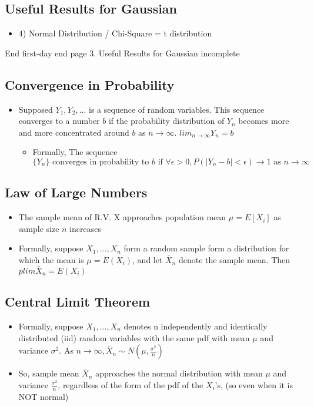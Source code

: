 \documentclass[10pt, oneside]{article}
\begin{document}
\subsection{Useful Results for Gaussian}
\begin{itemize}
    \item 4) Normal Distribution / Chi-Square = t distribution
\end{itemize}


End first-day end page 3. Useful Results for Gaussian incomplete

\subsection{Convergence in Probability}
\begin{itemize}
    \item Supposed $Y_1, Y_2,...$ is a sequence of random variables. This sequence converges to a number $b$ if the probability distribution of $Y_n$ becomes more and more concentrated around $b$ as $n\rightarrow \infty$. $lim_{n\rightarrow \infty} Y_n = b$
    \begin{itemize}
        \item Formally, The sequence $\{Y_n\} \text{ converges in probability to } b \text{ if }\forall \epsilon > 0, P(|Y_n-b| < \epsilon) \rightarrow 1 \text{ as } n\rightarrow \infty$
    \end{itemize}
\end{itemize}

\subsection{Law of Large Numbers}
\begin{itemize}
    \item The sample mean of R.V. X approaches population mean $\mu = E[X_i]$ as sample size $n$ increases
    \item Formally, suppose $X_1, ..., X_n$ form a random sample form a distribution for which the mean is $\mu =E(X_i)$, and let $\bar X_n $ denote the sample mean. Then $plim \bar X_n = E(X_i)$
\end{itemize}

\subsection{Central Limit Theorem}
\begin{itemize}
    \item Formally, suppose $X_1, ..., X_n$ denotes n independently and identically distributed (iid) random variables with the same pdf with mean $\mu$ and variance $\sigma^2$. As $n\rightarrow \infty, \bar X_n \sim N(\mu, \frac{\sigma^2}{n})$
    \item So, sample mean $\bar X_n $ approaches the normal distribution with mean $\mu$ and variance $\frac{\sigma^2}{n}$, regardless of the form of the pdf of the $X_i$'s, (so even when it is NOT normal)
\end{itemize}
\end{document}
